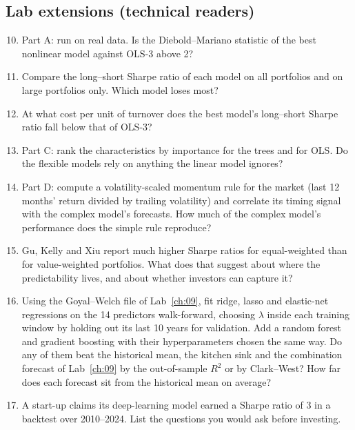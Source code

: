\subsection*{Lab extensions (technical readers)}

\begin{enumerate}
  \setcounter{enumi}{9}
  \item Part A: run on real data. Is the Diebold--Mariano statistic of the best nonlinear model against OLS-3 above 2?
  \item Compare the long--short Sharpe ratio of each model on all portfolios and on large portfolios only. Which model loses most?
  \item At what cost per unit of turnover does the best model's long--short Sharpe ratio fall below that of OLS-3?
  \item Part C: rank the characteristics by importance for the trees and for OLS. Do the flexible models rely on anything the linear model ignores?
  \item\label{ex:20-volmom} Part D: compute a volatility-scaled momentum rule for the market (last 12 months' return divided by trailing volatility) and correlate its timing signal with the complex model's forecasts. How much of the complex model's performance does the simple rule reproduce?
  \item Gu, Kelly and Xiu report much higher Sharpe ratios for equal-weighted than for value-weighted portfolios. What does that suggest about where the predictability lives, and about whether investors can capture it?
  \item Using the Goyal--Welch file of Lab~\ref{ch:09}, fit ridge, lasso and elastic-net regressions on the 14 predictors walk-forward, choosing $\lambda$ inside each training window by holding out its last 10 years for validation. Add a random forest and gradient boosting with their hyperparameters chosen the same way. Do any of them beat the historical mean, the kitchen sink and the combination forecast of Lab~\ref{ch:09} by the out-of-sample $R^2$ or by Clark--West? How far does each forecast sit from the historical mean on average?
  \item A start-up claims its deep-learning model earned a Sharpe ratio of 3 in a backtest over 2010--2024. List the questions you would ask before investing.
\end{enumerate}
